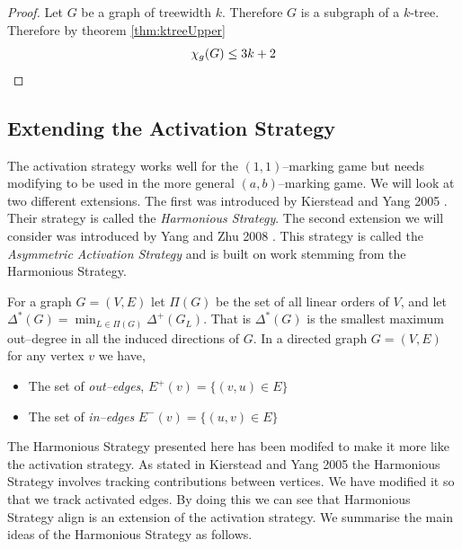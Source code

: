 \begin{proof}
    Let $G$ be a graph of treewidth $k$.
    Therefore $G$ is a subgraph of a $k$-tree. Therefore by theorem \ref{thm:ktreeUpper} \[\chi_g(G) \leq 3k + 2 \qedhere\] 
\end{proof}

\subsection{Extending the Activation Strategy}

The activation strategy works well for the $(1,1)$--marking game but needs modifying to be used in the more general $(a,b)$--marking game. We will look at two different extensions. The first was introduced by Kierstead and Yang 2005 \cite{kierYang2005}. Their strategy is called the \textit{Harmonious Strategy}. The second extension we will consider was introduced by Yang and Zhu 2008 \cite{yangZhu2008}. This strategy is called the \textit{Asymmetric Activation Strategy} and is built on work stemming from the Harmonious Strategy. 

For a graph $G=(V,E)$ let $\Pi(G)$ be the set of all linear orders of $V$, and let $\Delta^*(G)=\min_{L\in \Pi(G)}\Delta^+(G_L)$. That is $\Delta^*(G)$ is the smallest maximum out--degree in all the induced directions of $G$. 
In a directed graph $G=(V,E)$ for any vertex $v$ we have, 
\begin{itemize}
    \item The set of \textit{out--edges}, $E^+(v) =\{(v,u)\in E\}$
    \item The set of \textit{in--edges} $E^-(v) =\{(u,v)\in E\}$ 
\end{itemize}  

The Harmonious Strategy presented here has been modifed to make it more like the activation strategy. As stated in Kierstead and Yang 2005 \cite{kierYang2005} the Harmonious Strategy involves tracking contributions between vertices. We have modified it so that we track activated edges. By doing this we can see that Harmonious Strategy align is an extension of the activation strategy. We summarise the main ideas of the Harmonious Strategy as follows. 

